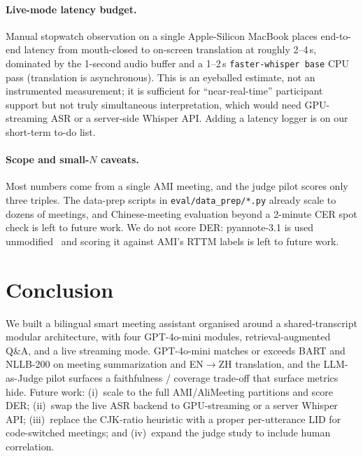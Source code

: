 \documentclass[11pt,a4paper]{article}
\begin{document}
\paragraph{Live-mode latency budget.}
Manual stopwatch observation on a single Apple-Silicon MacBook places
end-to-end latency from mouth-closed to on-screen translation at
roughly 2--4\,s, dominated by the 1-second audio buffer and a 1--2\,s
\texttt{faster-whisper base} CPU pass (translation is asynchronous).
This is an eyeballed estimate, not an instrumented measurement; it is
sufficient for ``near-real-time'' participant support but not truly
simultaneous interpretation, which would need GPU-streaming ASR or a
server-side Whisper API. Adding a latency logger is on our short-term
to-do list.

\paragraph{Scope and small-$N$ caveats.}
Most numbers come from a single AMI meeting, and the judge pilot
scores only three triples. The data-prep scripts in
\texttt{eval/data\_prep/*.py} already scale to dozens of meetings,
and Chinese-meeting evaluation beyond a 2-minute CER spot check is
left to future work. We do not score DER: pyannote-3.1 is used
unmodified~\cite{plaquet23powerset} and scoring it against AMI's
RTTM labels is left to future work.

\section{Conclusion}
\label{sec:conclusion}
We built a bilingual smart meeting assistant organised around a
shared-transcript modular architecture, with four GPT-4o-mini modules,
retrieval-augmented Q\&A, and a live streaming mode. GPT-4o-mini
matches or exceeds BART and NLLB-200 on meeting summarization and
EN$\to$ZH translation, and the LLM-as-Judge pilot surfaces a
faithfulness / coverage trade-off that surface metrics hide.
Future work: (i)~scale to the full AMI/AliMeeting partitions and
score DER; (ii)~swap the live ASR backend to GPU-streaming or a
server Whisper API; (iii)~replace the CJK-ratio heuristic with a
proper per-utterance LID for code-switched meetings; and
(iv)~expand the judge study to include human correlation.




\appendix
\end{document}
